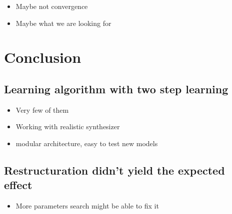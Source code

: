 \begin{itemize}
\tightlist
\item
  Maybe not convergence
\item
  Maybe what we are looking for
\end{itemize}

\chapter{Conclusion}\label{conclusion}

\section{Learning algorithm with two step
learning}\label{learning-algorithm-with-two-step-learning}

\begin{itemize}
\tightlist
\item
  Very few of them
\item
  Working with realistic synthesizer
\item
  modular architecture, easy to test new models
\end{itemize}

\section{Restructuration didn't yield the expected
effect}\label{restructuration-didnt-yield-the-expected-effect}

\begin{itemize}
\tightlist
\item
  More parameters search might be able to fix it
\end{itemize}
